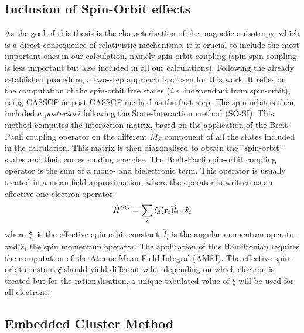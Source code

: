 \documentclass[12pt,a4paper]{report}
\numberwithin{equation}{section}
\begin{document}
\subsection{Inclusion of Spin-Orbit effects}

As the goal of this thesis is the characterisation of the magnetic anisotropy, which is a direct consequence of relativistic mechanisms, it is crucial to include the most important ones in our calculation, namely spin-orbit coupling (spin-spin coupling is less important but also included in all our calculations).
Following the already established procedure, a two-step approach is chosen for this work.
It relies on the computation of the spin-orbit free states (\textit{i.e.} independant from spin-orbit), using CASSCF or post-CASSCF method as the first step.
The spin-orbit is then included $a$ $posteriori$ following the State-Interaction method (SO-SI).
This method computes the interaction matrix, based on the application of the Breit-Pauli coupling operator on the different $M_S$ component of all the states included in the calculation.
This matrix is then diagonalised to obtain the ''spin-orbit'' states and their corresponding energies.
The Breit-Pauli spin-orbit coupling operator is the sum of a mono- and bielectronic term.
This operator is usually treated in a mean field approximation, where the operator is written as an effective one-electron operator:
\begin{equation}
    \hat{H}^{SO}=\sum_{i} \xi_i(\vb r_i) \hat{l}_i \cdot \hat{s}_i
\end{equation}
where $\xi_i$ is the effective spin-orbit constant, $\hat{l}_i$ is the angular momentum operator and $\hat{s}_i$ the spin momentum operator.
The application of this Hamiltonian requires the computation of the Atomic Mean Field Integral (AMFI).
The effective spin-orbit constant $\xi$ should yield different value depending on which electron is treated but for the rationalisation, a unique tabulated value of $\xi$ will be used for all electrons.

\subsection{Embedded Cluster Method}
\end{document}
